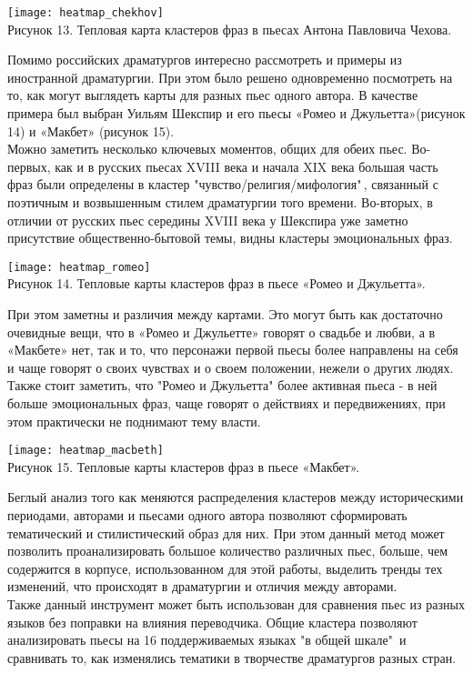 \documentclass[a4paper,14pt]{article}
\begin{document}
\begin{justify}
\begin{center}
	\texttt{[image: heatmap\_chekhov]} \\
	Рисунок 13. Тепловая карта кластеров фраз в пьесах Антона Павловича Чехова.
\end{center}
\indent
Помимо российских драматургов интересно рассмотреть и примеры из иностранной драматургии. При этом было решено одновременно посмотреть на то, как могут выглядеть карты для разных пьес одного автора. В качестве примера был выбран Уильям Шекспир и его пьесы «Ромео и Джульетта»(рисунок 14) и «Макбет» (рисунок 15).\\
\indent
Можно заметить несколько ключевых моментов, общих для обеих пьес. Во-первых, как и в русских пьесах XVIII века и начала XIX века большая часть фраз были определены в кластер "чувство/религия/мифология"\,, связанный с поэтичным и возвышенным стилем драматургии того времени. Во-вторых, в отличии от русских пьес середины XVIII века у Шекспира уже заметно присутствие общественно-бытовой темы, видны кластеры эмоциональных фраз.
\begin{center}
	\texttt{[image: heatmap\_romeo]} \\
	Рисунок 14. Тепловые карты кластеров фраз в пьесе «Ромео и Джульетта».
\end{center}
При этом заметны и различия между картами. Это могут быть как достаточно очевидные вещи, что в «Ромео и Джульетте» говорят о свадьбе и любви, а в «Макбете» нет, так и то, что персонажи первой пьесы более направлены на себя и чаще говорят о своих чувствах и о своем положении, нежели о других людях. Также стоит заметить, что "Ромео и Джульетта" более активная пьеса - в ней больше эмоциональных фраз, чаще говорят о действиях и передвижениях, при этом практически не поднимают тему власти.
\begin{center}
	\texttt{[image: heatmap\_macbeth]} \\
	Рисунок 15. Тепловые карты кластеров фраз в пьесе «Макбет».
\end{center}
\indent
Беглый анализ того как меняются распределения кластеров между историческими периодами, авторами и пьесами одного автора позволяют сформировать тематический и стилистический образ для них. При этом данный метод может позволить проанализировать большое количество различных пьес, больше, чем содержится в корпусе, использованном для этой работы, выделить тренды тех изменений, что происходят в драматургии и отличия между авторами. \\
\indent
Также данный инструмент может быть использован для сравнения пьес из разных языков без поправки на влияния переводчика. Общие кластера позволяют анализировать пьесы на 16 поддерживаемых языках "в общей шкале"\ и сравнивать то, как изменялись тематики в творчестве драматургов разных стран. \\
\indent
\end{justify}
\pagebreak
\end{document}
